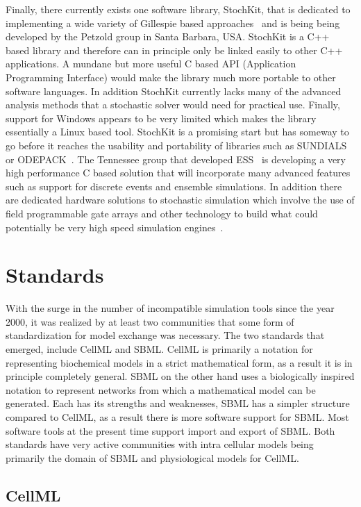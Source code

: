 \documentclass[12pt]{article}
\begin{document}
Finally, there currently exists one software library, StochKit, that
is dedicated to implementing a wide variety of Gillespie based
approaches~\citep{StochKit:2007} and is being being developed by the Petzold group in Santa Barbara, USA. StochKit is a C++ based library and therefore can in principle only be linked easily to other C++ applications. A mundane but more useful C based API (Application Programming Interface) would make the library much more portable to other software languages. In addition StochKit currently lacks many of the advanced analysis methods that a stochastic solver would need for practical use. Finally, support for Windows appears to be very limited which makes the library essentially a Linux based tool. StochKit is a promising start but has someway to go before it reaches the usability and portability of libraries such as SUNDIALS~\citep{CVODE:2005} or ODEPACK~\cite{HIND83}. The Tennessee group that developed ESS~\citep{cox:2003} is developing a very high performance C based solution that will incorporate many advanced features such as support for discrete events and ensemble simulations. In addition there are dedicated hardware solutions to stochastic simulation which involve the use of field programmable gate arrays and other technology to build what could potentially be very high speed simulation engines~\citep{peterson:2002,mccollum:2003,yoshimi2004}.


\section{Standards}

With the surge in the number of incompatible simulation tools since
the year 2000, it was realized by at least two communities that some
form of standardization for model exchange was necessary. The two
standards that emerged, include CellML and SBML. CellML is primarily
a notation for representing biochemical models in a strict
mathematical form, as a result it is in principle completely
general. SBML on the other hand uses a biologically inspired
notation to represent networks from which a mathematical model can
be generated. Each has its strengths and weaknesses, SBML has a
simpler structure compared to CellML, as a result there is more
software support for SBML. Most software tools at the present time
support import and export of SBML. Both standards have very active
communities with intra cellular models being primarily the domain of
SBML and physiological models for CellML.

\subsection{CellML}
\end{document}
